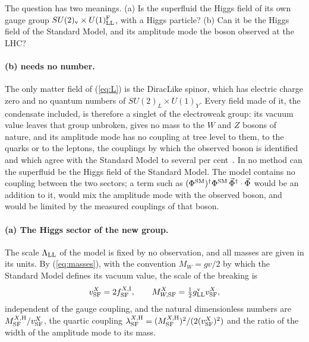 \documentclass[aps,prd,twocolumn,superscriptaddress,nofootinbib,floatfix,longbibliography]{revtex4-2}
\newcommand{\LL}{{\rm LL}}
\newcommand{\SF}{{\rm SF}}
\begin{document}
The question has two meanings. (a) Is the superfluid the Higgs field of its own gauge group
$SU(2)_{\rm v}\times U(1)^{\rm F}_\LL$, with a Higgs particle? (b) Can it be the Higgs field of the Standard Model, and its
amplitude mode the boson observed at the LHC?

\paragraph*{(b) needs no number.}
The only matter field of (\ref{eq:L}) is the DiracLike spinor, which has electric charge zero and no quantum numbers of
$SU(2)_L\times U(1)_Y$. Every field made of it, the condensate included, is therefore a singlet of the electroweak group:
its vacuum value leaves that group unbroken, gives no mass to the $W$ and $Z$ bosons of nature, and its amplitude mode
has no coupling at tree level to them, to the quarks or to the leptons, the couplings by which the observed boson is
identified and which agree with the Standard Model to several per cent~\cite{ATLAS2022,CMS2022}. In no method can the
superfluid be the Higgs field of the Standard Model. The model contains no coupling between the two sectors; a term such
as $(\Phi^{\rm SM})^\dagger\Phi^{\rm SM}\,\vec\Phi^\dagger\cdot\vec\Phi$ would be an addition to it, would mix the amplitude mode
with the observed boson, and would be limited by the measured couplings of that boson.

\paragraph*{(a) The Higgs sector of the new group.}
The scale $\Lambda_\LL$ of the model is fixed by no observation, and all masses are given in its units. By
(\ref{eq:masses}), with the convention $M_W=gv/2$ by which the Standard Model defines its vacuum value, the scale of the
breaking is
\begin{equation}
v^X_\SF=2f^{X,{\rm I}}_\SF ,\qquad M^X_{W,\SF}=\tfrac12g^{\rm v}_\LL v^X_\SF ,
\label{eq:vSF}
\end{equation}
independent of the gauge coupling, and the natural dimensionless numbers are $M^{X,{\rm H}}_\SF/v^X_\SF$, the quartic coupling
$\lambda^{X,{\rm H}}_\SF=(M^{X,{\rm H}}_\SF)^2/(2(v^X_\SF)^2)$ and the ratio of the width of the amplitude mode to its mass.
\end{document}
